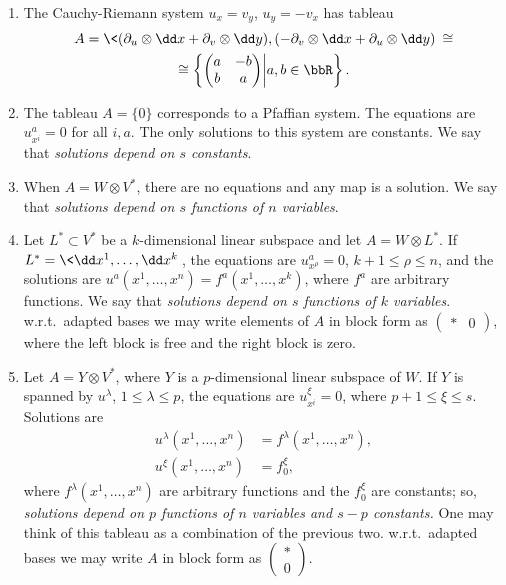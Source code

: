 \begin{example}\label{ex tableau}
    \begin{enumerate}
        \item The Cauchy-Riemann system $u_{x}=v_{y}$, $u_{y}=-v_{x}$ has tableau 
        \begin{multline}
            A=\<(\partial_{u}\otimes\dd x+\partial_{v}\otimes\dd y),(-\partial_{v}\otimes \dd x+\partial_{u}\otimes\dd y)\>\cong\\
            \cong \left\{
                \begin{pmatrix}
                    a& -b\\b&a
                \end{pmatrix}\middle|a,b\in\bbR
            \right\}.
        \end{multline}
        \item  The tableau $A=\{0\}$ corresponds to a Pfaffian system. The equations are $u^a_{x^i}=0$ for all $i,a$. The only solutions to this system are constants. We say that \emph{solutions depend on $s$ constants}.
        \item When $A=W\otimes V^\ast$, there are no equations and any map is a solution. We say that \emph{solutions depend on $s$ functions of $n$ variables}.
        \item Let $L^\ast\subset V^\ast$ be a $k$-dimensional linear subspace and let $A=W\otimes L^\ast$. If $L^\ast=\<\dd x^1,\ldots,\dd x^k\>$, the equations are $u^a_{x^\rho}=0$, $k+1\leq \rho\leq n$, and the solutions are $u^a(x^1,\ldots,x^n)=f^a(x^1,\ldots,x^k)$, where $f^a$ are arbitrary functions. We say that \emph{solutions depend on $s$ functions of $k$ variables}. w.r.t.\ adapted bases we may write elements of $A$ in block form as $\left(\begin{smallmatrix}
            *&0
        \end{smallmatrix}\right)$, where the left block is free and the right block is zero.
        \item Let $A=Y\otimes V^\ast$, where $Y$ is a $p$-dimensional linear subspace of $W$. If $Y$ is spanned by $u^\lambda$, $1\leq \lambda\leq p$, the equations are $u^\xi_{x^i}=0$, where $p+1\leq \xi\leq s$. Solutions are 
        \begin{align}
            u^\lambda(x^1,\ldots,x^n)&=f^\lambda(x^1,\ldots,x^n),\\
            u^\xi(x^1,\ldots,x^n)&=f^\xi_0,
        \end{align}
        where $f^\lambda(x^1,\ldots,x^n)$ are arbitrary functions and the $f_0^\xi$ are constants; so, \emph{solutions depend on $p$ functions of $n$ variables and $s-p$ constants.} One may think of this tableau as a combination of the previous two. w.r.t.\ adapted bases we may write $A$ in block form as $\left(\begin{smallmatrix}
            *\\0
        \end{smallmatrix}\right)$.
    \end{enumerate}
\end{example}


